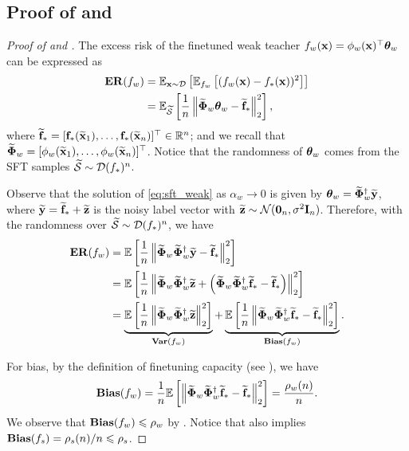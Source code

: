 \subsection{Proof of  and }\label{apx:pf_sft_weak}
\begin{proof}[Proof of  and ]
    The excess risk of the finetuned weak teacher $f_w(\xb) = \phi_w(\xb)^\top \thetab_w$ can be expressed as
    \begin{align*}
        \exrisk(f_w) &= \E_{\xb \sim \Dcal}\sbr{\E_{f_w}\sbr{(f_w(\xb) - f_*(\xb))^2}} \\
        &= \E_{\wt\Scal}\sbr{\frac{1}{n}\nbr{\wt\Phib_w \thetab_w - \wt\fb_*}_2^2},
    \end{align*}
    where $\wt\fb_* = [\fb_*(\wt\xb_1), \ldots, \fb_*(\wt\xb_n)]^\top \in \R^n$; and we recall that $\wt\Phib_w = [\phi_w(\wt\xb_1), \ldots, \phi_w(\wt\xb_n)]^\top$. Notice that the randomness of $\thetab_w$ comes from the SFT samples $\wt\Scal \sim \Dcal(f_*)^n$.

    Observe that the solution of \eqref{eq:sft_weak} as $\alpha_w \to 0$ is given by $\thetab_w = \wt\Phib_w^\dagger \wt\yb$, where $\wt\yb = \wt\fb_* + \wt\zb$ is the noisy label vector with $\wt\zb \sim \Ncal(\b0_n, \sigma^2 \Ib_n)$.
    Therefore, with the randomness over $\wt\Scal \sim \Dcal(f_*)^n$, we have
    \begin{align*}
        \exrisk(f_w) &= \E \sbr{\frac{1}{n}\nbr{\wt\Phib_w \wt\Phib_w^\dagger \wt\yb - \wt\fb_*}_2^2} \\
        &= \E \sbr{\frac{1}{n}\nbr{\wt\Phib_w \wt\Phib_w^\dagger \wt\zb + \rbr{\wt\Phib_w \wt\Phib_w^\dagger \wt\fb_* - \wt\fb_*}}_2^2} \\
        &= \underbrace{\E \sbr{\frac{1}{n}\nbr{\wt\Phib_w \wt\Phib_w^\dagger \wt\zb}_2^2}}_{\vari(f_w)} + \underbrace{\E\sbr{\frac{1}{n}\nbr{\wt\Phib_w \wt\Phib_w^\dagger \wt\fb_* - \wt\fb_*}_2^2}}_{\bias(f_w)}.
    \end{align*}
    
    For bias, by the definition of finetuning capacity (see ), we have
    \begin{align*}
        \bias(f_w) = \frac{1}{n} \E\sbr{\nbr{\wt\Phib_w \wt\Phib_w^\dagger \wt\fb_* - \wt\fb_*}_2^2} = \frac{\rho_w(n)}{n}.
    \end{align*}
    We observe that $\bias(f_w) \le \rho_w$ by .
    Notice that  also implies $\bias(f_s) = {\rho_s(n)}/{n} \le \rho_s$. 


\end{proof}

